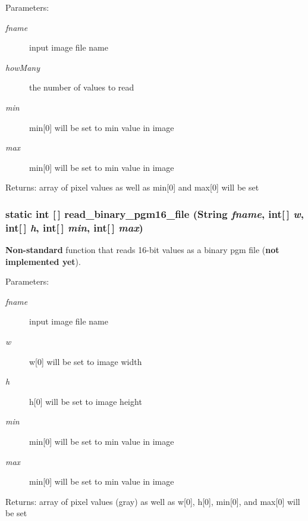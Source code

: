 \begin{Desc}
\item[Parameters:]
\begin{description}
\item[{\em fname}]input image file name \item[{\em how\-Many}]the number of values to read \item[{\em min}]min[0] will be set to min value in image \item[{\em max}]min[0] will be set to min value in image\end{description}
\end{Desc}
\begin{Desc}
\item[Returns:]array of pixel values as well as min[0] and max[0] will be set \end{Desc}
\subsubsection{\setlength{\rightskip}{0pt plus 5cm}static int [$\,$] read\_\-binary\_\-pgm16\_\-file (String {\em fname}, int[$\,$] {\em w}, int[$\,$] {\em h}, int[$\,$] {\em min}, int[$\,$] {\em max})\hspace{0.3cm}{\tt  [static]}}\label{class_c_s_image_viewer_1_1pnm_helper_1e7365b006549d4971e267f5378e3290}


{\bf Non-standard} function that reads 16-bit values as a binary pgm file ({\bf not implemented yet}). 

\begin{Desc}
\item[Parameters:]
\begin{description}
\item[{\em fname}]input image file name \item[{\em w}]w[0] will be set to image width \item[{\em h}]h[0] will be set to image height \item[{\em min}]min[0] will be set to min value in image \item[{\em max}]min[0] will be set to min value in image\end{description}
\end{Desc}
\begin{Desc}
\item[Returns:]array of pixel values (gray) as well as w[0], h[0], min[0], and max[0] will be set \end{Desc}

